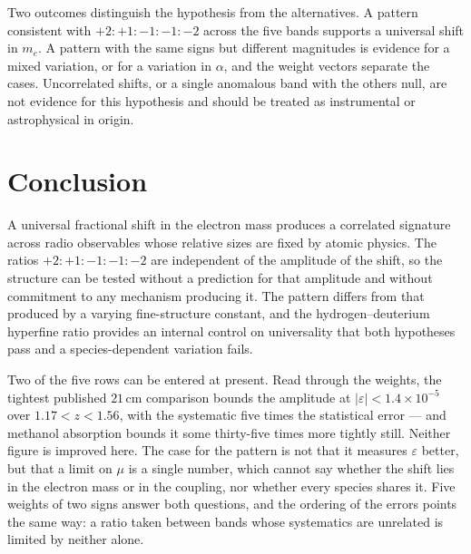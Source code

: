 \documentclass[aps,prd,twocolumn,superscriptaddress,nofootinbib,10pt]{revtex4-2}
\begin{document}
Two outcomes distinguish the hypothesis from the alternatives. A pattern consistent with
$+2:+1:-1:-1:-2$ across the five bands supports a universal shift in $m_e$. A pattern with the
same signs but different magnitudes is evidence for a mixed variation, or for a variation in
$\alpha$, and the weight vectors separate the cases. Uncorrelated shifts, or a single anomalous
band with the others null, are not evidence for this hypothesis and should be treated as
instrumental or astrophysical in origin.

\section{Conclusion}

A universal fractional shift in the electron mass produces a correlated signature across radio
observables whose relative sizes are fixed by atomic physics. The ratios
$+2:+1:-1:-1:-2$ are independent of the amplitude of the shift, so the structure can be tested
without a prediction for that amplitude and without commitment to any mechanism producing it. The
pattern differs from that produced by a varying fine-structure constant, and the
hydrogen--deuterium hyperfine ratio provides an internal control on universality that both
hypotheses pass and a species-dependent variation fails.

Two of the five rows can be entered at present. Read through the weights, the tightest published
$21\,$cm comparison bounds the amplitude at $|\varepsilon| < 1.4 \times 10^{-5}$ over
$1.17 < z < 1.56$, with the systematic five times the statistical error --- and methanol absorption
bounds it some thirty-five times more tightly still. Neither figure is improved here. The case for
the pattern is not that it measures $\varepsilon$ better, but that a limit on $\mu$ is a single
number, which cannot say whether the shift lies in the electron mass or in the coupling, nor
whether every species shares it. Five weights of two signs answer both questions, and the ordering
of the errors points the same way: a ratio taken between bands whose systematics are unrelated is
limited by neither alone.



\end{document}
